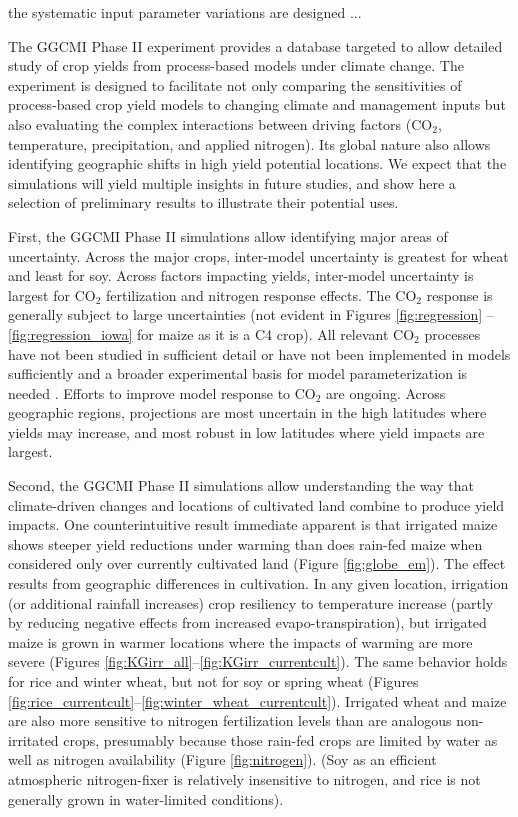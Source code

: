 \documentclass[preprint, 5p, times, twocolumn]{elsarticle}
\begin{document}
the systematic input parameter variations are designed ...

The GGCMI Phase II experiment provides a database targeted to allow detailed study of crop yields from process-based models under climate change. The experiment is designed to facilitate not only comparing the sensitivities of process-based crop yield models to changing climate and management inputs but also evaluating the complex interactions between driving factors (CO$_2$, temperature, precipitation, and applied nitrogen). Its global nature also allows identifying geographic shifts in high yield potential locations.  We expect that the simulations will yield multiple insights in future studies, and show here a selection of preliminary results to illustrate their potential uses. 

First, the GGCMI Phase II simulations allow identifying major areas of uncertainty. Across the major crops, inter-model uncertainty is greatest for wheat and least for soy. Across factors impacting yields, inter-model uncertainty is largest for CO$_2$ fertilization and nitrogen response effects. The CO$_2$ response is generally subject to large uncertainties (not evident in Figures \ref{fig:regression} -- \ref{fig:regression_iowa} for maize as it is a C4 crop). All relevant CO$_2$ processes have not been studied in sufficient detail or have not been implemented in models sufficiently \citep[e.g.][]{Boote13} and a broader experimental basis for model parameterization is needed \citep{leaky09}. Efforts to improve model response to CO$_2$ are ongoing. Across geographic regions, projections are most uncertain in the high latitudes where yields may increase, and most robust in low latitudes where yield impacts are largest.  

Second, the GGCMI Phase II simulations allow understanding the way that climate-driven changes and locations of cultivated land combine to produce yield impacts. One counterintuitive result immediate apparent is that irrigated maize shows steeper yield reductions under warming than does rain-fed maize when considered only over currently cultivated land (Figure \ref{fig:globe_em}). The effect results from geographic differences in cultivation. In any given location, irrigation (or additional rainfall increases) crop resiliency to temperature increase (partly by reducing negative effects from increased evapo-transpiration), but irrigated maize is grown in warmer locations where the impacts of warming are more severe (Figures \ref{fig:KGirr_all}--\ref{fig:KGirr_currentcult}). The same behavior holds for rice and winter wheat, but not for soy or spring wheat (Figures \ref{fig:rice_currentcult}--\ref{fig:winter_wheat_currentcult}). Irrigated wheat and maize are also more sensitive to nitrogen fertilization levels than are analogous non-irritated crops, presumably because those rain-fed crops are limited by water as well as nitrogen availability (Figure \ref{fig:nitrogen}). (Soy as an efficient atmospheric nitrogen-fixer is relatively insensitive to nitrogen, and rice is not generally grown in water-limited conditions).
\end{document}
